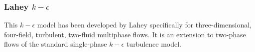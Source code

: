 \documentclass[11pt,a4paper]{article}
\begin{document}
\subsubsection{Lahey $k-\epsilon$}
This \textit{$k-\epsilon$} model has been developed by Lahey \citep{Lahey} specifically for three-dimensional, four-field, turbulent, two-fluid multiphase flows. It is an extension to two-phase flows of the standard single-phase $k-\epsilon$ turbulence model.\\
\end{document}
